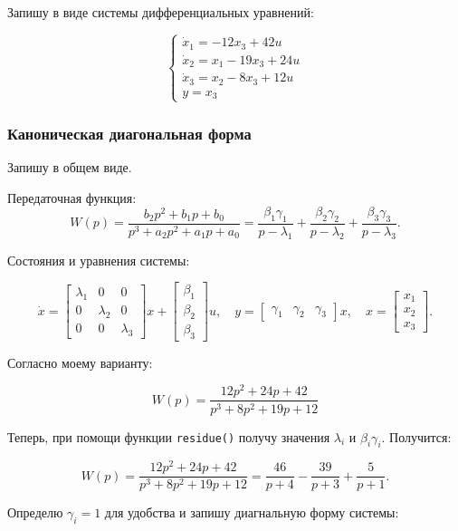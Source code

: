 \documentclass[a4paper,12pt]{article}
\begin{document}
	Запишу в виде системы дифференциальных уравнений:
	
	\[
	\begin{cases}
		\dot{x}_1 = -12 x_3 + 42 u \\[6pt]
		\dot{x}_2 = x_1 - 19 x_3 + 24 u \\[6pt]
		\dot{x}_3 = x_2 - 8 x_3 + 12 u \\[6pt]
		y = x_3
	\end{cases}
	\]
	
	\subsubsection{Каноническая диагональная форма}
	
	Запишу в общем виде.
	
	Передаточная функция:
	\[
	W(p) = \frac{b_2 p^2 + b_1 p + b_0}{p^3 + a_2 p^2 + a_1 p + a_0} = 
	\frac{\beta_1 \gamma_1}{p - \lambda_1} + \frac{\beta_2 \gamma_2}{p - \lambda_2} + \frac{\beta_3 \gamma_3}{p - \lambda_3}.
	\]
	
	Состояния и уравнения системы:
	
	\[
	\dot{x} = 
	\begin{bmatrix}
		\lambda_1 & 0 & 0 \\
		0 & \lambda_2 & 0 \\
		0 & 0 & \lambda_3
	\end{bmatrix} x +
	\begin{bmatrix}
		\beta_1 \\ \beta_2 \\ \beta_3
	\end{bmatrix} u,
	\quad
	y = 
	\begin{bmatrix}
		\gamma_1 & \gamma_2 & \gamma_3
	\end{bmatrix} x,
	\quad
	x = \begin{bmatrix} x_1 \\ x_2 \\ x_3 \end{bmatrix}.
	\]
	
	Согласно моему варианту: 
	
	\[
	W(p) = \frac{12p^2 + 24 p + 42}{p^3 + 8 p^2 + 19 p + 12} 
	\]
	
	Теперь, при помощи функции \texttt{residue()} получу значения \(\lambda_i\) и \(\beta_i\gamma_i\). Получится:
	
	\[
	W(p) = \frac{12p^2 + 24 p + 42}{p^3 + 8 p^2 + 19 p + 12}  = 
	\frac{46}{p + 4} - \frac{39}{p + 3} + \frac{5}{p + 1}.
	\] 
	
	Определю \(\gamma_i = 1\) для удобства и запишу диагнальную форму системы:
	
\end{document}
